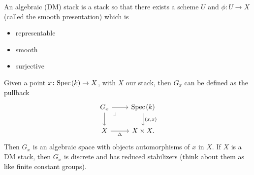 \documentclass[11pt]{amsart}
\begin{document}
\begin{definition} An algebraic (DM) stack is a stack so that there exists a scheme $U$ and $\phi \colon U \to X$ (called the smooth presentation) which is
\begin{itemize}
    \item representable
    \item smooth
    \item surjective
\end{itemize}
\end{definition}

Given a point $x \colon \text{Spec}\hspace{0.1em}(k) \to X$, with $X$ our stack, then $G_x$ can be defined as the pullback
\[ \begin{tikzcd}
    G_x\rar\dar\pb & \Spec(k)\dar["{(x,x)}" right]\\
    X\rar["\Delta" below] & X \times X.
\end{tikzcd} \]
Then $G_x$ is an algebraic space with objects automorphisms of $x$ in $X$. If $X$ is a DM stack, then $G_x$ is discrete and has reduced stabilizers (think about them as like finite constant groups).
\end{document}

